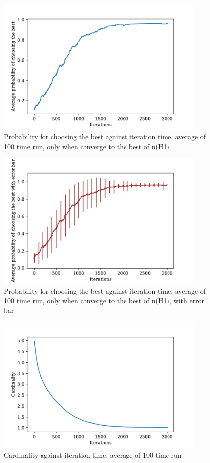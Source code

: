 \documentclass[a4paper,12pt]{article}
\begin{document}
	\begin{figure}[H]
		\centering
		\includegraphics[width=0.9\textwidth]{correct_pbestnorm1_toss200_3000_100}
		\caption{Probability for choosing the best against iteration time, average of 100 time run, only when converge to the best of n(H1)}\label{correct_pbestnorm1_toss200_3000_100}
	\end{figure}
	\begin{figure}[H]
		\centering
		\includegraphics[width=0.9\textwidth]{correct_pbest_errbarnorm1_toss200_3000_100}
		\caption{Probability for choosing the best against iteration time, average of 100 time run, only when converge to the best of n(H1), with error bar}\label{correct_pbest_errbarnorm1_toss200_3000_100}
	\end{figure}
	\begin{figure}[H]
		\centering
		\includegraphics[width=0.9\textwidth]{cardnorm1_toss200_3000_100}
		\caption{Cardinality against iteration time, average of 100 time run}\label{cardnorm1_toss200_3000_100}
	\end{figure}
\end{document}
